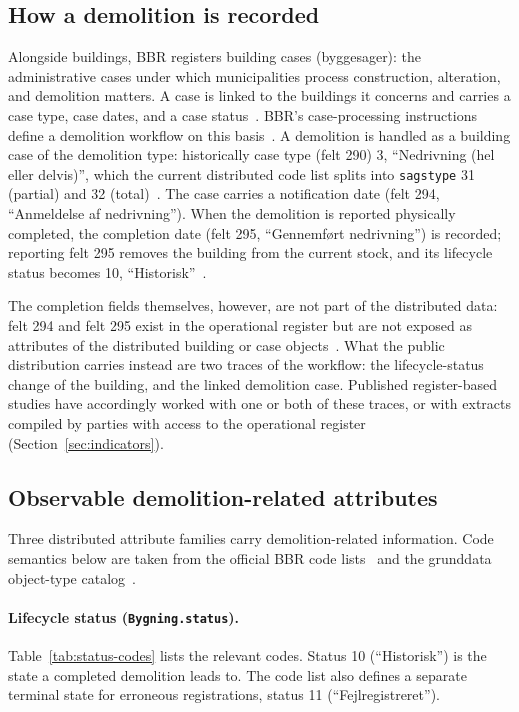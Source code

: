 \subsection{How a demolition is recorded}\label{sec:bbr-chain}

Alongside buildings, BBR registers building cases (byggesager): the
administrative cases under which municipalities process construction,
alteration, and demolition matters. A case is linked to the buildings
it concerns and carries a case type, case dates, and a case
status~\cite{bbr_instruks, datafordeler_grunddatamodel}. BBR's
case-processing instructions define a demolition workflow on this
basis~\cite{bbr_instruks}. A demolition is handled as a building case
of the demolition type: historically case type (felt 290) 3,
``Nedrivning (hel eller delvis)'', which the current distributed code
list splits into \texttt{sagstype} 31 (partial) and 32
(total)~\cite{bbr_kodelister}. The case carries a notification date
(felt 294, ``Anmeldelse af nedrivning''). When the demolition is
reported physically completed, the completion date (felt 295,
``Gennemf{\o}rt nedrivning'') is recorded; reporting felt 295 removes
the building from the current stock, and its lifecycle status becomes
10, ``Historisk''~\cite{bbr_instruks}.

The completion fields themselves, however, are not part of the
distributed data: felt 294 and felt 295 exist in the operational
register but are not exposed as attributes of the distributed building
or case objects~\cite{datafordeler_grunddatamodel}. What the public
distribution carries instead are two traces of the workflow: the
lifecycle-status change of the building, and the linked demolition case.
Published register-based studies have accordingly worked with one or
both of these traces, or with extracts compiled by parties with access
to the operational register (Section~\ref{sec:indicators}).

\subsection{Observable demolition-related attributes}\label{sec:bbr-fields}

Three distributed attribute families carry demolition-related
information. Code semantics below are taken from the official BBR code
lists~\cite{bbr_kodelister} and the grunddata object-type
catalog~\cite{datafordeler_grunddatamodel}.

\paragraph{Lifecycle status (\texttt{Bygning.status}).}
Table~\ref{tab:status-codes} lists the relevant codes. Status 10
(``Historisk'') is the state a completed demolition leads to. The code
list also defines a separate terminal state for erroneous registrations,
status 11 (``Fejlregistreret'').


